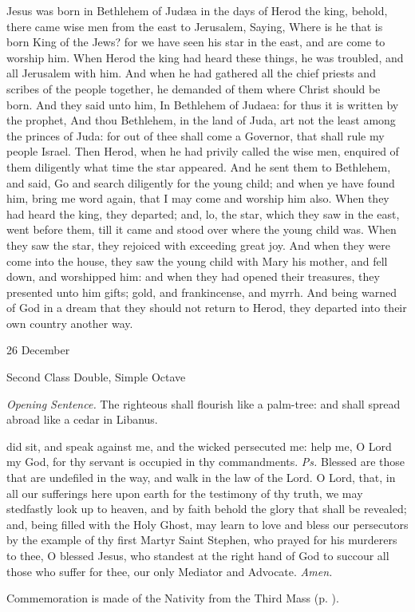  Jesus was born in Bethlehem of Jud{\ae}a in the days of Herod the king, behold, there came wise men from the east to Jerusalem, Saying, Where is he that is born King of the Jews? for we have seen his star in the east, and are come to worship him. When Herod the king had heard these things, he was troubled, and all Jerusalem with him. And when he had gathered all the chief priests and scribes of the people together, he demanded of them where Christ should be born. And they said unto him, In Bethlehem of Judaea: for thus it is written by the prophet, And thou Bethlehem, in the land of Juda, art not the least among the princes of Juda: for out of thee shall come a Governor, that shall rule my people Israel. Then Herod, when he had privily called the wise men, enquired of them diligently what time the star appeared. And he sent them to Bethlehem, and said, Go and search diligently for the young child; and when ye have found him, bring me word again, that I may come and worship him also. When they had heard the king, they departed; and, lo, the star, which they saw in the east, went before them, till it came and stood over where the young child was. When they saw the star, they rejoiced with exceeding great joy. And when they were come into the house, they saw the young child with Mary his mother, and fell down, and worshipped him: and when they had opened their treasures, they presented unto him gifts; gold, and frankincense, and myrrh. And being warned of God in a dream that they should not return to Herod, they departed into their own country another way.

\clearpage

\begin{inhead}
{26 December}\par
{Second Class Double, Simple Octave}
\end{inhead}
\par\noindent
\textit{Opening Sentence.} The righteous shall flourish like a palm-tree: and shall spread abroad like a cedar in Libanus.

\properantiphonfix

\introit
{} did sit, and speak against me, and the wicked persecuted me: help me, O Lord my God, for thy servant is occupied in thy commandments. \textit{Ps.} Blessed are those that are undefiled in the way, and walk in the law of the Lord.
\collect
{} O Lord, that, in all our sufferings here upon earth for the testimony of thy truth, we may stedfastly look up to heaven, and by faith behold the glory that shall be revealed; and, being filled with the Holy Ghost, may learn to love and bless our persecutors by the example of thy first Martyr Saint Stephen, who prayed for his murderers to thee, O blessed Jesus, who standest at the right hand of God to succour all those who suffer for thee, our only Mediator and Advocate. \textit{Amen.}
\begin{rubric}
    Commemoration is made of the Nativity from the Third Mass (p. \pageref{NativityMassIIICollect}).
\end{rubric}

